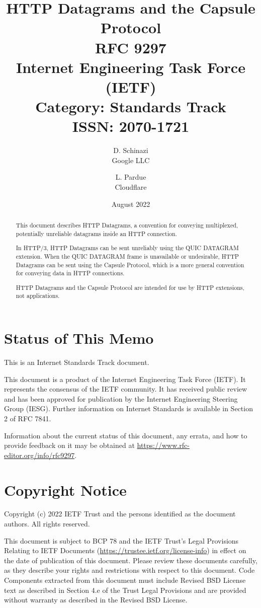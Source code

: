\documentclass{article}
\title{HTTP Datagrams and the Capsule Protocol\\
\large RFC 9297\\
\large Internet Engineering Task Force (IETF)\\
\large Category: Standards Track\\
\large ISSN: 2070-1721}
\author{
D. Schinazi\\
Google LLC
\and
L. Pardue\\
Cloudflare
}
\date{August 2022}
\begin{document}
\maketitle

\begin{abstract}
This document describes HTTP Datagrams, a convention for conveying
multiplexed, potentially unreliable datagrams inside an HTTP
connection.

In HTTP/3, HTTP Datagrams can be sent unreliably using the QUIC
DATAGRAM extension.  When the QUIC DATAGRAM frame is unavailable or
undesirable, HTTP Datagrams can be sent using the Capsule Protocol,
which is a more general convention for conveying data in HTTP
connections.

HTTP Datagrams and the Capsule Protocol are intended for use by HTTP
extensions, not applications.
\end{abstract}

\section*{Status of This Memo}

This is an Internet Standards Track document.

This document is a product of the Internet Engineering Task Force
(IETF).  It represents the consensus of the IETF community.  It has
received public review and has been approved for publication by the
Internet Engineering Steering Group (IESG).  Further information on
Internet Standards is available in Section 2 of RFC 7841.

Information about the current status of this document, any errata,
and how to provide feedback on it may be obtained at
\url{https://www.rfc-editor.org/info/rfc9297}.

\section*{Copyright Notice}

Copyright (c) 2022 IETF Trust and the persons identified as the
document authors.  All rights reserved.

This document is subject to BCP 78 and the IETF Trust's Legal
Provisions Relating to IETF Documents
(\url{https://trustee.ietf.org/license-info}) in effect on the date of
publication of this document.  Please review these documents
carefully, as they describe your rights and restrictions with respect
to this document.  Code Components extracted from this document must
include Revised BSD License text as described in Section 4.e of the
Trust Legal Provisions and are provided without warranty as described
in the Revised BSD License.
\end{document}
